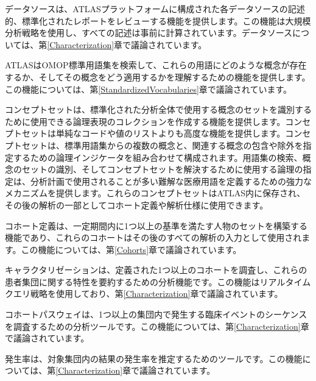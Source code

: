 \documentclass[
  11pt]{book}
\providecommand{\tightlist}{%
  \setlength{\itemsep}{0pt}\setlength{\parskip}{0pt}}
\theoremstyle{definition}
\theoremstyle{definition}
\theoremstyle{definition}
\theoremstyle{definition}
\theoremstyle{remark}
\begin{document}
\begin{description}
\tightlist
\item[データソース \index{ATLAS!データソース} \index{Achilles|see {ATLAS!データソース}}]
データソースは、ATLASプラットフォームに構成された各データソースの記述的、標準化されたレポートをレビューする機能を提供します。この機能は大規模分析戦略を使用し、すべての記述は事前に計算されています。データソースについては、第\ref{Characterization}章で議論されています。
\item[用語集検索 \index{ATLAS!用語集検索}]
ATLASはOMOP標準用語集を検索して、これらの用語にどのような概念が存在するか、そしてその概念をどう適用するかを理解するための機能を提供します。この機能については、第\ref{StandardizedVocabularies}章で議論されています。
\item[コンセプトセット \index{ATLAS!コンセプトセット}]
コンセプトセットは、標準化された分析全体で使用する概念のセットを識別するために使用できる論理表現のコレクションを作成する機能を提供します。コンセプトセットは単純なコードや値のリストよりも高度な機能を提供します。コンセプトセットは、標準用語集からの複数の概念と、関連する概念の包含や除外を指定するための論理インジケータを組み合わせて構成されます。用語集の検索、概念のセットの識別、そしてコンセプトセットを解決するために使用する論理の指定は、分析計画で使用されることが多い難解な医療用語を定義するための強力なメカニズムを提供します。これらのコンセプトセットはATLAS内に保存され、その後の解析の一部としてコホート定義や解析仕様に使用できます。
\item[コホート定義 \index{ATLAS!コホート定義}]
コホート定義は、一定期間内に1つ以上の基準を満たす人物のセットを構築する機能であり、これらのコホートはその後のすべての解析の入力として使用されます。この機能については、第\ref{Cohorts}章で議論されています。
\item[キャラクタリゼーション \index{ATLAS!コホートキャラクタリゼーション}]
キャラクタリゼーションは、定義された1つ以上のコホートを調査し、これらの患者集団に関する特性を要約するための分析機能です。この機能はリアルタイムクエリ戦略を使用しており、第\ref{Characterization}章で議論されています。
\item[コホートパスウェイ \index{ATLAS!コホートパスウェイ}]
コホートパスウェイは、1つ以上の集団内で発生する臨床イベントのシーケンスを調査するための分析ツールです。この機能については、第\ref{Characterization}章で議論されています。
\item[発生率 \index{ATLAS!発生率}]
発生率は、対象集団内の結果の発生率を推定するためのツールです。この機能については、第\ref{Characterization}章で議論されています。
\item[プロファイル \index{ATLAS!プロファイル}]

\end{description}
\end{document}
